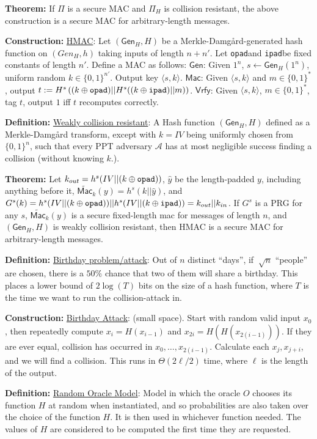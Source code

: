 \documentclass[10pt]{article}
\newcommand{\AAA}{\mathcal{A}}
\newcommand{\defn}[1]{{\bf Definition:} \underline{#1}}
\newcommand{\thm}[1]{{\bf Theorem:} \underline{#1}}
\newcommand{\con}[1]{{\bf Construction:} \underline{#1}}
\newcommand{\Mac}{\mathsf{Mac}}
\newcommand{\Vrfy}{\mathsf{Vrfy}}
\newcommand{\Gen}{\mathsf{Gen}}
\newcommand{\ang}[1]{\langle#1\rangle}
\newcommand{\xor}{\oplus}
\newcommand{\opad}{{\tt opad}}
\newcommand{\ipad}{{\tt ipad}}
\newcommand{\from}{\leftarrow}
\begin{document}
\begin{multicols}{3}
\thm{}If $\Pi$ is a secure MAC and $\Pi_H$ is collision resistant, the above construction is a secure MAC for arbitrary-length messages.

\con{HMAC}: Let $(\Gen_H,H)$ be a Merkle-Damg\r{a}rd-generated hash function on $(Gen_H,h)$ taking inputs of length $n+n'$. Let \opad and \ipad be fixed constants of length $n'$. Define a MAC as follows: $\Gen$: Given $1^n$, $s\from\Gen_H(1^n)$, uniform random $k\in\{0,1\}^{n'}$. Output key $\ang{s,k}$. $\Mac$: Given $\ang{s,k}$ and $m\in\{0,1\}^*$, output $t:=H^s\left((k\xor\opad)||H^s((k\xor\ipad)||m)\right)$. $\Vrfy$: Given $\ang{s,k}$, $m\in\{0,1\}^*$, tag $t$, output $1$ iff $t$ recomputes correctly.

\defn{Weakly collision resistant}: A Hash function $(\Gen_H, H)$ defined as a Merkle-Damg\r{a}rd transform, except with $k=IV$ being uniformly chosen from $\{0,1\}^n$, such that every PPT adversary $\AAA$ has at most negligible success finding a collision (without knowing $k$.).

\thm{}Let $k_{out}=h^s(IV||(k\xor\opad))$, $\hat{y}$ be the length-padded $y$, including anything before it, $\widetilde{\Mac}_k(y)=h^s(k||\hat{y})$, and $G^s(k)=h^s(IV||(k\xor\opad))||h^s(IV||(k\xor\ipad))=k_{out}||k_{in}$. If $G^s$ is a PRG for any $s$, $\widetilde{\Mac}_k(y)$ is a secure fixed-length mac for messages of length $n$, and $(\Gen_H,H)$ is weakly collision resistant, then HMAC is a secure MAC for arbitrary-length messages.

\defn{Birthday problem/attack}: Out of $n$ distinct ``days'', if $~\sqrt{n}$ ``people'' are chosen, there is a $50\%$ chance that two of them will share a birthday. This places a lower bound of $2\log(T)$ bits on the size of a hash function, where $T$ is the time we want to run the collision-attack in.

\con{Birthday Attack}: (small space). Start with random valid input $x_0$, then repeatedly compute $x_i=H(x_{i-1})$ and $x_{2i}=H(H(x_{2(i-1)}))$. If they are ever equal, collision has occurred in $x_0,\dots,x_{2(i-1)}$. Calculate each $x_j,x_{j+i}$, and we will find a collision. This runs in $\Theta(2{\ell/2})$ time, where $\ell$ is the length of the output.

\defn{Random Oracle Model}: Model in which the oracle $O$ chooses its function $H$ at random when instantiated, and so probabilities are also taken over the choice of the function $H$. It is then used in whichever function needed. The values of $H$ are considered to be computed the first time they are requested.


\end{multicols}
\end{document}
